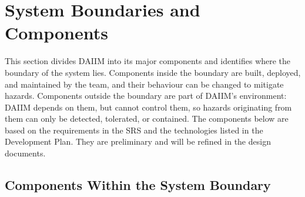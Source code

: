 \documentclass{article}
\begin{document}

\section{System Boundaries and Components}

This section divides DAIIM into its major components and identifies where the
boundary of the system lies. Components inside the boundary are built,
deployed, and maintained by the team, and their behaviour can be changed to
mitigate hazards. Components outside the boundary are part of DAIIM's
environment: DAIIM depends on them, but cannot control them, so hazards
originating from them can only be detected, tolerated, or contained. The
components below are based on the requirements in the SRS and the technologies
listed in the Development Plan. They are preliminary and will be refined in the
design documents.

\subsection{Components Within the System Boundary}
\end{document}
